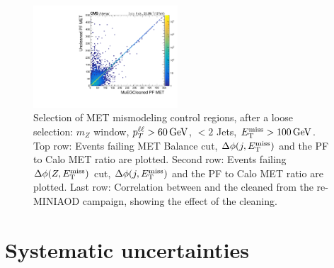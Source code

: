 \begin{figure}[hb]
  \includegraphics[width=0.48\textwidth]{figures/ll_metAltVsUncleaned.pdf}
  \caption{
    Selection of MET mismodeling control regions, after a loose selection: $m_Z$ window, $p_{T}^{\ell\ell}>60\,\text{Ge\hspace{-.08em}V}$, $<2$ Jets, $E_\mathrm{T}^{\mathrm{miss}}>100\,\text{Ge\hspace{-.08em}V}$.
    Top row: Events failing MET Balance cut, $\Delta\phi(j,E_\mathrm{T}^{\mathrm{miss}})$ and the PF to Calo MET ratio are plotted.
    Second row: Events failing $\Delta\phi(Z,E_\mathrm{T}^{\mathrm{miss}})$ cut, $\Delta\phi(j,E_\mathrm{T}^{\mathrm{miss}})$ and the PF to Calo MET ratio are plotted.
    Last row: Correlation between \met and the cleaned \met from the re-MINIAOD campaign, showing the effect of the cleaning.
  }
  \label{fig:met_control}
\end{figure}



\section{Systematic uncertainties}
